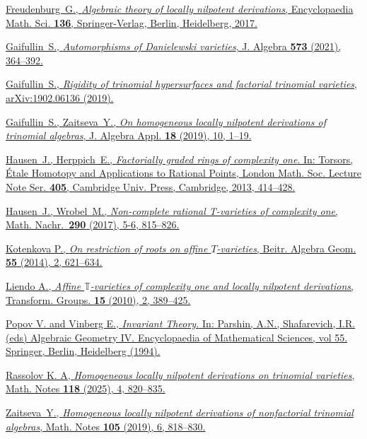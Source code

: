 \documentclass[a4paper,reqno,12pt]{amsart}
\theoremstyle{plain}
\theoremstyle{definition}
\theoremstyle{plain}
\theoremstyle{remark}
\newcommand{\TT}{\mathbb{T}}
\begin{document}
\begin{thebibliography}{}
\href{https://link.springer.com/book/10.1007/978-3-662-55350-3}{Freudenburg~G., \emph{Algebraic theory of locally nilpotent derivations}, Encyclopaedia Math. Sci. {\bf 136}, Springer-Verlag, Berlin, Heidelberg, 2017.}

\href{https://www.sciencedirect.com/science/article/pii/S0021869321000089}{Gaifullin~S.,
\emph{Automorphisms of Danielewski varieties},
J. Algebra {\bf 573} (2021), 364--392.}

\href{https://arxiv.org/abs/1902.06136}{Gaifullin~S., \emph{Rigidity of trinomial hypersurfaces and factorial trinomial varieties}, arXiv:1902.06136 (2019).}

\href{https://www.mathnet.ru/php/archive.phtml?wshow=paper&jrnid=mzm&paperid=11763&option_lang=eng}{Gaifullin~S., Zaitseva~Y.,
\emph{On homogeneous locally nilpotent derivations of trinomial algebras},
J. Algebra Appl. {\bf 18} (2019), 10, 1--19.}

\href{https://www.researchgate.net/publication/45919314_Factorially_graded_rings_of_complexity_one}{Hausen~J., Herppich~E.,
\emph{Factorially graded rings of complexity one}. In:
Torsors, \'Etale
Homotopy and Applications to Rational Points, London Math. Soc. Lecture Note Ser. {\bf 405}, Cambridge Univ. Press, Cambridge, 2013, 414--428.}

\href{https://arxiv.org/abs/1512.08930}{Hausen~J., Wrobel~M.,
\emph{Non-complete rational T-varieties of complexity one},
Math. Nachr.~{\bf 290} (2017), 5-6, 815--826.}

\href{https://doi.org/10.1007/s13366-013-0179-x}{Kotenkova P.,
\emph{On restriction of roots on affine $T$-varieties},
Beitr. Algebra Geom. {\bf 55} (2014), 2, 621--634.}

\href{https://doi.org/10.1007/s00031-010-9089-2}{Liendo A., \emph{Affine ${\TT}$-varieties of complexity one and locally nilpotent
derivations}, Transform. Groups. {\bf 15} (2010), 2, 389--425.}

\href{https://doi.org/10.1007/978-3-662-03073-8_2}{Popov V. and Vinberg E., \emph{Invariant Theory.} In: Parshin, A.N., Shafarevich, I.R. (eds) Algebraic Geometry IV. Encyclopaedia of Mathematical Sciences, vol 55. Springer, Berlin, Heidelberg (1994).}

\href{https://arxiv.org/abs/2509.08491}{Rassolov K. A, \emph{Homogeneous locally nilpotent derivations on trinomial varieties}, Math. Notes {\bf 118} (2025), 4, 820--835.}

\href{https://www.mathnet.ru/php/archive.phtml?wshow=paper&jrnid=mzm&paperid=11763&option_lang=eng}{Zaitseva~Y., \emph{Homogeneous locally nilpotent derivations of nonfactorial trinomial algebras}, Math. Notes {\bf 105} (2019), 6, 818--830.}

\end{thebibliography}
\end{document}
